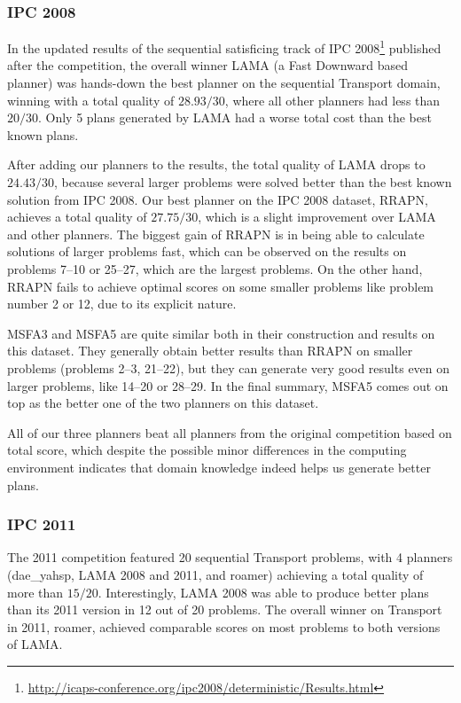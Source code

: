 \subsubsection{IPC 2008}

In the updated results of the sequential satisficing track of IPC 2008\footnote{\url{http://icaps-conference.org/ipc2008/deterministic/Results.html}} published after the competition,
the overall winner LAMA (a Fast Downward based planner)
was hands-down the best planner on the sequential Transport domain, winning
with a total quality of $28.93/30$, where all other planners had less than $20/30$.
Only 5 plans generated by LAMA had a worse total cost than the best known plans.

After adding our planners to the results,
the total quality of LAMA drops to $24.43/30$,
because several larger problems were solved better than the
best known solution from IPC 2008.
Our best planner on the IPC 2008 dataset, RRAPN, achieves a total quality of $27.75/30$,
which is a slight improvement over LAMA and other planners. The biggest gain of RRAPN is in being able to calculate
solutions of larger problems fast, which can be observed on
the results on problems 7--10 or 25--27,
which are the largest problems.
On the other hand, RRAPN fails to achieve optimal scores
on some smaller problems like problem number 2 or 12,
due to its explicit nature.

MSFA3 and MSFA5 are quite similar both in their construction and results on this dataset.
They generally obtain better results than RRAPN on smaller problems
(problems 2--3, 21--22),
but they can generate very good results even on larger problems,
like 14--20 or 28--29.
In the final summary, MSFA5 comes out on top as the better one of the two planners on this dataset.

All of our three planners beat all planners from the original competition based on total score,
which despite the possible minor differences in the computing environment indicates that
domain knowledge indeed helps us generate better plans.

\subsubsection{IPC 2011}

The 2011 competition featured 20 sequential Transport problems,
with 4 planners (dae\_yahsp, LAMA 2008 and 2011, and roamer) achieving a total quality of more than $15/20$.
Interestingly, LAMA 2008 was able to produce better plans than its 2011 version in 12 out of 20 problems. The overall winner on Transport in 2011, roamer, achieved comparable scores on most problems to both versions of LAMA.

